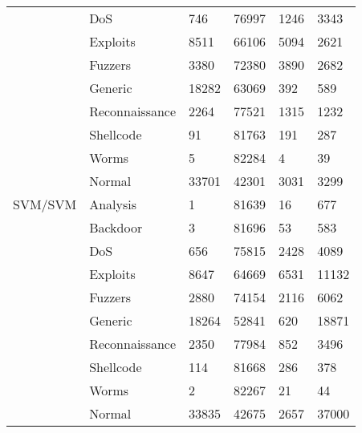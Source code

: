 \begin{longtable}{@{}llllll@{}}
        & DoS            & 746   & 76997 & 1246  & 3343  \\
        & Exploits       & 8511  & 66106 & 5094  & 2621  \\
        & Fuzzers        & 3380  & 72380 & 3890  & 2682  \\
        & Generic        & 18282 & 63069 & 392   & 589   \\
        & Reconnaissance & 2264  & 77521 & 1315  & 1232  \\
        & Shellcode      & 91    & 81763 & 191   & 287   \\
        & Worms          & 5     & 82284 & 4     & 39    \\
        & Normal         & 33701 & 42301 & 3031  & 3299  \\
SVM/SVM & Analysis       & 1     & 81639 & 16    & 677   \\
        & Backdoor       & 3     & 81696 & 53    & 583   \\
        & DoS            & 656   & 75815 & 2428  & 4089  \\
        & Exploits       & 8647  & 64669 & 6531  & 11132 \\
        & Fuzzers        & 2880  & 74154 & 2116  & 6062  \\
        & Generic        & 18264 & 52841 & 620   & 18871 \\
        & Reconnaissance & 2350  & 77984 & 852   & 3496  \\
        & Shellcode      & 114   & 81668 & 286   & 378   \\
        & Worms          & 2     & 82267 & 21    & 44    \\
        & Normal         & 33835 & 42675 & 2657  & 37000 \\ \bottomrule
\end{longtable}
